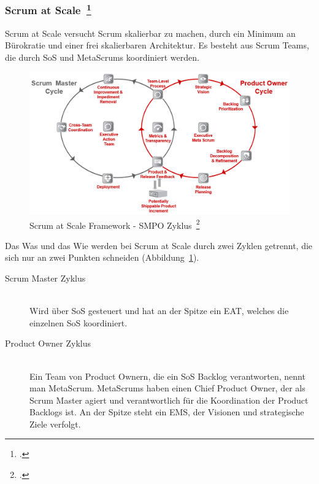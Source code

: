 \subsubsection[Scrum at Scale]{Scrum at Scale~\footcite[vgl.][]{scale}}

Scrum at Scale versucht Scrum skalierbar zu machen, durch ein Minimum an Bürokratie und einer frei skalierbaren Architektur.
Es besteht aus Scrum Teams, die durch \ac{SoS} und MetaScrums koordiniert werden. 
\begin{savenotes}
  \begin{figure}[H] 
    \centering
       \includegraphics[width=1.0\textwidth]{img/scrumatscale.png}
    \caption[Scrum at Scale Framework - SMPO Zyklus]{Scrum at Scale Framework - SMPO Zyklus~\footcite{scrumatscale_framework}}\label{fig:sas}
  \end{figure}
\end{savenotes}

Das Was und das Wie werden bei Scrum at Scale durch zwei Zyklen getrennt, die sich nur an zwei Punkten schneiden (Abbildung~\ref{fig:sas}).
\begin{description}
  \item[Scrum Master Zyklus] \hfill \\ Wird über \ac{SoS} gesteuert und hat an der Spitze ein \ac{EAT}, welches die einzelnen \ac{SoS} koordiniert.
  \item[Product Owner Zyklus] \hfill \\ Ein Team von Product Ownern, die ein \ac{SoS} Backlog verantworten, nennt man MetaScrum. MetaScrums haben einen Chief Product Owner, der als Scrum Master agiert und verantwortlich für die Koordination der Product Backlogs ist. An der Spitze steht ein \ac{EMS}, der Visionen und strategische Ziele verfolgt.
\end{description}

